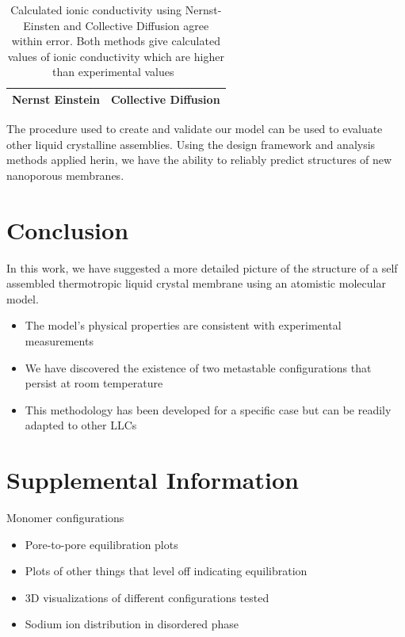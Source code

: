 \documentclass{article}
\begin{document}
	\begin{table}
	\centering
	\begin{tabular}{|c|c|}
	\hline
	Nernst Einstein & Collective Diffusion \\
	\hline
	\end{tabular}
	\caption{Calculated ionic conductivity using Nernst-Einsten and Collective Diffusion agree within error. Both methods give calculated values of ionic conductivity which are higher than experimental values~\label{table:conductivity}}
	\end{table}

	The procedure used to create and validate our model can be used to evaluate other liquid crystalline assemblies. Using the design framework and analysis methods applied herin, we have the ability to reliably predict structures of new nanoporous membranes.

	\section{Conclusion}
	
	In this work, we have suggested a more detailed picture of the structure of a self assembled thermotropic liquid crystal membrane using an atomistic molecular model.
	\begin{itemize}
		\item The model's physical properties are consistent with experimental measurements
		\item We have discovered the existence of two metastable configurations that persist at room temperature
		\item This methodology has been developed for a specific case but can be readily adapted to other LLCs
	\end{itemize}

	\section{Supplemental Information} %
	
	Monomer configurations
	\begin{itemize}
		\item Pore-to-pore equilibration plots
		\item Plots of other things that level off indicating equilibration
		\item 3D visualizations of different configurations tested
		\item Sodium ion distribution in disordered phase
	\end{itemize}
	
\end{document}
